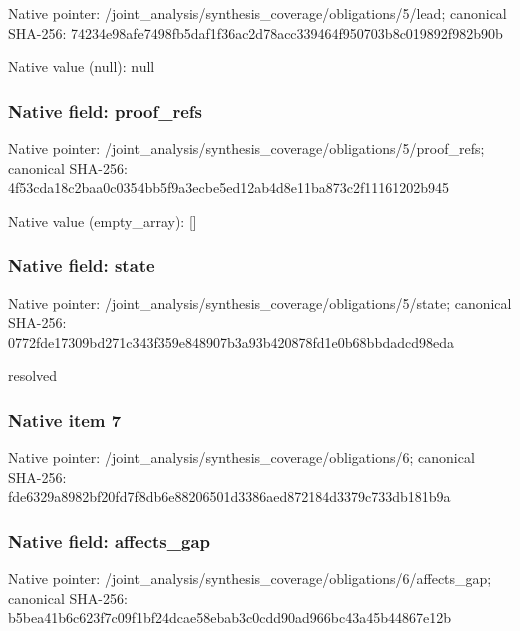 \documentclass[10pt,a4paper]{article}
\begin{document}
Native pointer: /joint\_analysis/synthesi\allowbreak{}s\_coverage/obligations/5\allowbreak{}/lead; canonical SHA-256: 74234e98afe7498fb5daf1f3\allowbreak{}6ac2d78acc339464f950703b\allowbreak{}8c019892f982b90b



Native value (null): null



\subsubsection{Native field: proof\_refs}


Native pointer: /joint\_analysis/synthesi\allowbreak{}s\_coverage/obligations/5\allowbreak{}/proof\_refs; canonical SHA-256: 4f53cda18c2baa0c0354bb5f\allowbreak{}9a3ecbe5ed12ab4d8e11ba87\allowbreak{}3c2f11161202b945



Native value (empty\_array): []



\subsubsection{Native field: state}


Native pointer: /joint\_analysis/synthesi\allowbreak{}s\_coverage/obligations/5\allowbreak{}/state; canonical SHA-256: 0772fde17309bd271c343f35\allowbreak{}9e848907b3a93b420878fd1e\allowbreak{}0b68bbdadcd98eda


resolved


\subsubsection{Native item 7}


Native pointer: /joint\_analysis/synthesi\allowbreak{}s\_coverage/obligations/6; canonical SHA-256: fde6329a8982bf20fd7f8db6\allowbreak{}e88206501d3386aed872184d\allowbreak{}3379c733db181b9a



\subsubsection{Native field: affects\_gap}


Native pointer: /joint\_analysis/synthesi\allowbreak{}s\_coverage/obligations/6\allowbreak{}/affects\_gap; canonical SHA-256: b5bea41b6c623f7c09f1bf24\allowbreak{}dcae58ebab3c0cdd90ad966b\allowbreak{}c43a45b44867e12b
\end{document}
